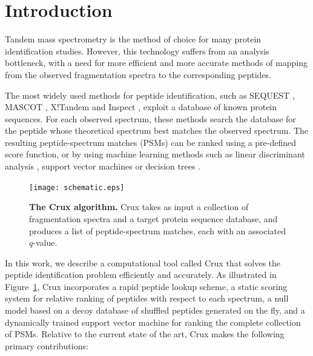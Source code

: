 \documentclass{bioinfo}
\renewcommand{\cite}{\citep}
\begin{document}
\section{Introduction}

Tandem mass spectrometry is the method of choice for many protein
identification studies.  However, this technology suffers from an
analysis bottleneck, with a need for more efficient and more accurate
methods of mapping from the observed fragmentation spectra to the
corresponding peptides.

The most widely used methods for peptide identification, such as
SEQUEST \cite{eng:approach}, MASCOT \cite{perkins:probability},
X!Tandem \cite{craig:tandem} and Inspect \cite{tanner:inspect},
exploit a database of known protein sequences.  For each observed
spectrum, these methods search the database for the peptide whose
theoretical spectrum best matches the observed spectrum.  The
resulting peptide-spectrum matches (PSMs) can be ranked using a
pre-defined score function, or by using machine learning methods such
as linear discriminant analysis \cite{keller:empirical}, support
vector machines \cite{anderson:new, kall:semi-supervised} or decision
trees \cite{elias:intensity}.

\begin{figure}
\centering
\texttt{[image: schematic.eps]}
\caption{{\bf The Crux algorithm.}  Crux takes as input a collection
  of fragmentation spectra and a target protein sequence database, and
  produces a list of peptide-spectrum matches, each with an associated
  $q$-value.
  \label{figure:crux}}
\end{figure}

In this work, we describe a computational tool called Crux that solves
the peptide identification problem efficiently and accurately.  As
illustrated in Figure~\ref{figure:crux}, Crux incorporates a rapid
peptide lookup scheme, a static scoring system for relative ranking of
peptides with respect to each spectrum, a null model based on a decoy
database of shuffled peptides generated on the fly, and a dynamically
trained support vector machine for ranking the complete collection of
PSMs.  Relative to the current state of the art, Crux makes the
following primary contributions:
\end{document}
